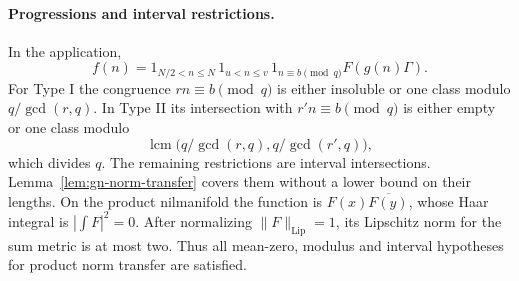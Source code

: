 \paragraph{Progressions and interval restrictions.}\label{gi-progressions}
In the application,
\[
 f(n)=1_{N/2<n\leq N}\,1_{u<n\leq v}\,1_{n\equiv b\pmod q}
                              F(g(n)\Gamma).
\]
For Type I the congruence $rn\equiv b\pmod q$ is either insoluble or
one class modulo $q/\gcd(r,q)$.  In Type II its intersection with
$r'n\equiv b\pmod q$ is either empty or one class modulo
\[
 \operatorname{lcm}\bigl(q/\gcd(r,q),q/\gcd(r',q)\bigr),
\]
which divides $q$.  The remaining restrictions are interval intersections.
Lemma~\ref{lem:gn-norm-transfer} covers them without a lower bound on
their lengths.  On the product nilmanifold the function is
$F(x)\overline{F(y)}$, whose Haar integral is
$|\int F|^2=0$.  After normalizing $\|F\|_{\mathrm{Lip}}=1$, its
Lipschitz norm for the sum metric is at most two.  Thus all mean-zero,
modulus and interval hypotheses for product norm transfer are satisfied.

